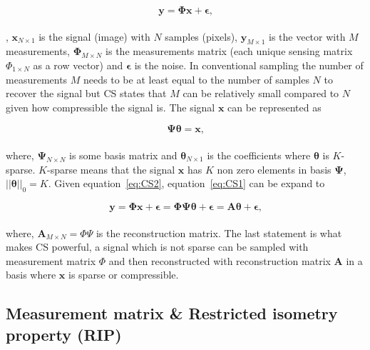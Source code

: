 \begin{equation}
\label{eq:CS1}
   \mathbf{ y = \Phi x + \epsilon}\text{,}
\end{equation}\\[0.1in]


, $\mathbf{x}_{N\times1}$ is the signal (image) with $N$ samples (pixels), $\mathbf{y}_{M\times1}$ is the vector with $M$ measurements, $\mathbf{\Phi}_{M \times N}$ is the measurements matrix (each unique sensing matrix $\Phi_{1 \times N}$ as a row vector) and $\mathbf{\epsilon}$ is the noise. In conventional sampling the number of measurements $M$ needs to be at least equal to the number of samples $N$ to recover the signal but CS states that $M$ can be relatively small compared to $N$ given how compressible the signal is. The signal $\mathbf{x}$ can be represented as  

\begin{equation}
\label{eq:CS2}
   \mathbf{ \Psi \theta = x }\text{,}
\end{equation}\\[0.1in]

where, $\mathbf{\Psi}_{N \times N}$ is some  basis matrix and
$\mathbf{\theta}_{N\times1}$ is the coefficients where $\mathbf{\theta}$ is $K$-sparse. $K$-sparse means that the signal $\mathbf{x}$ has $K$ non zero elements in basis $\mathbf{\Psi}$, $||\mathbf{\theta}||_0 = K$. Given equation~\ref{eq:CS2}, equation~\ref{eq:CS1} can be expand to


\begin{equation}
   \mathbf{ y = \Phi x + \epsilon = \Phi \Psi \theta + \epsilon = A \theta + \epsilon }\text{,}
\end{equation}\\[0.1in]

where, $\textbf{A}_{M \times N} = \Phi \Psi$ is the reconstruction matrix. The last statement is what makes CS powerful, a signal which is not sparse can be sampled with measurement matrix $\Phi$ and then reconstructed with reconstruction matrix $\textbf{A}$ in a basis where $\textbf{x}$ is sparse or compressible.


\subsection{Measurement matrix \& Restricted isometry property (RIP)}

